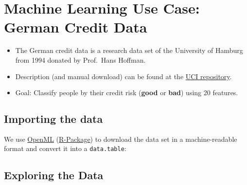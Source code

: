 \documentclass[]{article}
\newenvironment{Shaded}{\begin{snugshade}}{\end{snugshade}}
\newcommand{\CommentTok}[1]{\textcolor[rgb]{0.56,0.35,0.01}{\textit{#1}}}
\newcommand{\ControlFlowTok}[1]{\textcolor[rgb]{0.13,0.29,0.53}{\textbf{#1}}}
\newcommand{\DataTypeTok}[1]{\textcolor[rgb]{0.13,0.29,0.53}{#1}}
\newcommand{\DecValTok}[1]{\textcolor[rgb]{0.00,0.00,0.81}{#1}}
\newcommand{\KeywordTok}[1]{\textcolor[rgb]{0.13,0.29,0.53}{\textbf{#1}}}
\newcommand{\NormalTok}[1]{#1}
\newcommand{\OperatorTok}[1]{\textcolor[rgb]{0.81,0.36,0.00}{\textbf{#1}}}
\newcommand{\StringTok}[1]{\textcolor[rgb]{0.31,0.60,0.02}{#1}}
\providecommand{\tightlist}{%
  \setlength{\itemsep}{0pt}\setlength{\parskip}{0pt}}
\begin{document}
\hypertarget{machine-learning-use-case-german-credit-data}{%
\section{Machine Learning Use Case: German Credit
Data}\label{machine-learning-use-case-german-credit-data}}

\begin{itemize}
\tightlist
\item
  The German credit data is a research data set of the University of
  Hamburg from 1994 donated by Prof.~Hans Hoffman.
\item
  Description (and manual download) can be found at the
  \href{https://archive.ics.uci.edu/ml/datasets/Statlog+\%28German+Credit+Data\%29}{UCI
  repository}.
\item
  Goal: Classify people by their credit risk (\textbf{good} or
  \textbf{bad}) using 20 features.
\end{itemize}

\hypertarget{importing-the-data}{%
\subsection{Importing the data}\label{importing-the-data}}

We use \href{https://www.openml.org}{OpenML}
(\href{https://cran.r-project.org/package=OpenML}{R-Package}) to
download the data set in a machine-readable format and convert it into a
\texttt{data.table}:

\begin{Shaded}
\end{Shaded}

\hypertarget{exploring-the-data}{%
\subsection{Exploring the Data}\label{exploring-the-data}}
\end{document}
